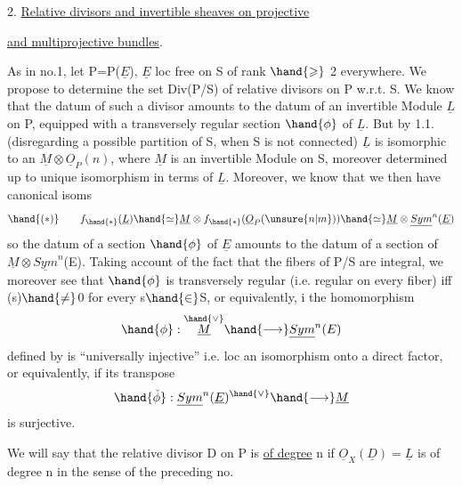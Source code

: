 
2. \uline{Relative divisors and invertible sheaves on projective}

\uline{and multiprojective bundles}.

 As in no.1, let P=P($\underline{E}$), $\underline{E}$ loc free on S of rank $\hand{\geqslant}$ 2 everywhere.
We propose to determine the set Div(P/S) of relative divisors
 on P w.r.t. S. We know that the datum of such a divisor amounts to the
datum of an invertible Module $\underline{L}$ on P, equipped with a transversely regular
section $\hand{\phi}$ of $\underline{L}$. But by 1.1. (disregarding a
possible partition of S, when S is not connected) $\underline{L}$ is isomorphic
to an $\underline{M}\otimes\underline{O}_P(n)$, where $\underline{M}$ is an invertible Module on S, moreover determined
up to unique isomorphism in terms of $\underline{L}$. Moreover, we know
that we then have canonical isoms
\[ \hand{(*)} \qquad f_{\hand{*}}(\underline{L}) \hand{\simeq} \underline{M}\otimes f_{\hand{*}}(\underline{O}_P(\unsure{n|m})) \hand{\simeq} \underline{M}\otimes\underline{Sym}^n(\underline{E}) \]
so the datum of a section  $\hand{\phi}$ of $\underline{E}$ amounts to the datum of a section
 of $\underline{M}\otimes\underline{Sym}^n$(E). Taking account of the fact that the fibers of P/S are integral,
we moreover see that $\hand{\phi}$ is transversely regular (i.e. regular
on every fiber) iff \hand{$\phi$}(s)$\hand{\neq}$0 for every s$\hand{\in}$S, or equivalently,
i the homomorphism
\[ \hand{\phi} : \overset{\hand{\vee}}{\underline{M}} \hand{\longrightarrow} \underline{Sym}^n(E) \]
defined by \hand{$\phi$} is ``universally injective'' i.e. loc an isomorphism onto
a direct factor, or equivalently, if its transpose
\[ \hand{\check{\phi}} : \underline{Sym}^n(\underline{E})^{\hand{\vee}} \hand{\longrightarrow} \underline{M} \]
is surjective.

We will say that the relative divisor D on P is \uline{of degree} n
if $\underline{O}_X(\underline{D})= \underline{L}$ is of degree n in the sense of the preceding no. 

